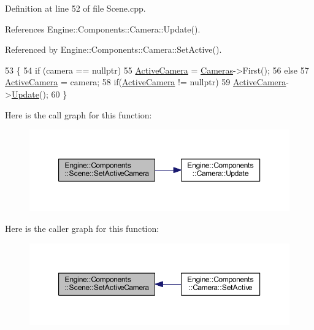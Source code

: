 Definition at line 52 of file Scene.\+cpp.



References Engine\+::\+Components\+::\+Camera\+::\+Update().



Referenced by Engine\+::\+Components\+::\+Camera\+::\+Set\+Active().


\begin{DoxyCode}
53 \{
54     \textcolor{keywordflow}{if} (camera == \textcolor{keyword}{nullptr})
55         \mbox{\hyperlink{classEngine_1_1Components_1_1Scene_a9408befee37d89e2c001d25b9e4ed75a}{ActiveCamera}} = \mbox{\hyperlink{classEngine_1_1Components_1_1Scene_aea98ff1ced88ee859878b504e9a2a362}{Cameras}}->First();
56     \textcolor{keywordflow}{else}
57         \mbox{\hyperlink{classEngine_1_1Components_1_1Scene_a9408befee37d89e2c001d25b9e4ed75a}{ActiveCamera}} = camera;
58     \textcolor{keywordflow}{if}(\mbox{\hyperlink{classEngine_1_1Components_1_1Scene_a9408befee37d89e2c001d25b9e4ed75a}{ActiveCamera}} != \textcolor{keyword}{nullptr})
59         \mbox{\hyperlink{classEngine_1_1Components_1_1Scene_a9408befee37d89e2c001d25b9e4ed75a}{ActiveCamera}}->\mbox{\hyperlink{classEngine_1_1Components_1_1Camera_a364f5e22921e3d234b31297a64c7d932}{Update}}();
60 \}
\end{DoxyCode}
Here is the call graph for this function\+:
\nopagebreak
\begin{figure}[H]
\begin{center}
\leavevmode
\includegraphics[width=350pt]{classEngine_1_1Components_1_1Scene_a936218df56c481f3aa12d684cee038f3_cgraph}
\end{center}
\end{figure}
Here is the caller graph for this function\+:
\nopagebreak
\begin{figure}[H]
\begin{center}
\leavevmode
\includegraphics[width=350pt]{classEngine_1_1Components_1_1Scene_a936218df56c481f3aa12d684cee038f3_icgraph}
\end{center}
\end{figure}
\mbox{\label{classEngine_1_1Components_1_1Scene_a064ce89da5daa483369c3253f04c9d21}} 
